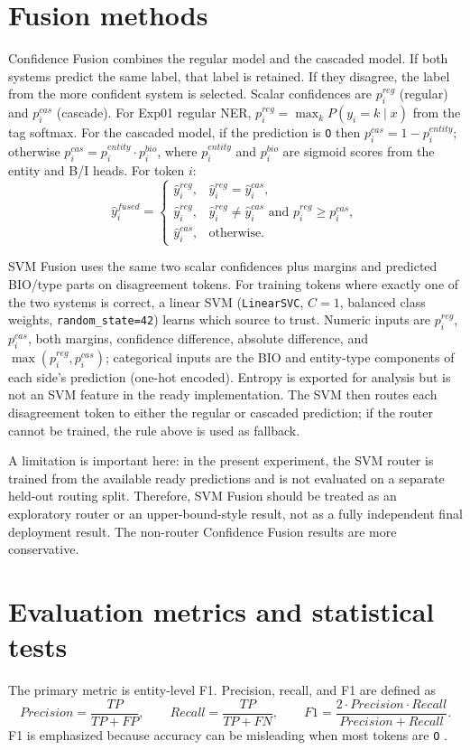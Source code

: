 \documentclass[12pt,a4paper]{report}
\begin{document}
\section{Fusion methods}
Confidence Fusion combines the regular model and the cascaded model. If both systems predict the same label, that label is retained. If they disagree, the label from the more confident system is selected. Scalar confidences are $p_i^{reg}$ (regular) and $p_i^{cas}$ (cascade). For Exp01 regular NER, $p_i^{reg}=\max_k P(y_i=k\mid x)$ from the tag softmax. For the cascaded model, if the prediction is \texttt{O} then $p_i^{cas}=1-p_i^{entity}$; otherwise $p_i^{cas}=p_i^{entity}\cdot p_i^{bio}$, where $p_i^{entity}$ and $p_i^{bio}$ are sigmoid scores from the entity and B/I heads. For token $i$:
\[
\hat{y}_i^{fused}=\begin{cases}
\hat{y}_i^{reg}, & \hat{y}_i^{reg}=\hat{y}_i^{cas},\\
\hat{y}_i^{reg}, & \hat{y}_i^{reg}\neq\hat{y}_i^{cas}\text{ and }p_i^{reg}\geq p_i^{cas},\\
\hat{y}_i^{cas}, & \text{otherwise.}
\end{cases}
\]

SVM Fusion uses the same two scalar confidences plus margins and predicted BIO/type parts on disagreement tokens. For training tokens where exactly one of the two systems is correct, a linear SVM (\texttt{LinearSVC}, $C=1$, balanced class weights, \texttt{random\_state=42}) learns which source to trust. Numeric inputs are $p_i^{reg}$, $p_i^{cas}$, both margins, confidence difference, absolute difference, and $\max(p_i^{reg},p_i^{cas})$; categorical inputs are the BIO and entity-type components of each side's prediction (one-hot encoded). Entropy is exported for analysis but is not an SVM feature in the ready implementation. The SVM then routes each disagreement token to either the regular or cascaded prediction; if the router cannot be trained, the rule above is used as fallback.

A limitation is important here: in the present experiment, the SVM router is trained from the available ready predictions and is not evaluated on a separate held-out routing split. Therefore, SVM Fusion should be treated as an exploratory router or an upper-bound-style result, not as a fully independent final deployment result. The non-router Confidence Fusion results are more conservative.

\section{Evaluation metrics and statistical tests}
The primary metric is entity-level F1. Precision, recall, and F1 are defined as
\[
Precision=\frac{TP}{TP+FP},
\qquad
Recall=\frac{TP}{TP+FN},
\qquad
F1=\frac{2\cdot Precision\cdot Recall}{Precision+Recall}.
\]
F1 is emphasized because accuracy can be misleading when most tokens are \texttt{O} \citep{sokolova2009,chicco2023mcc}.
\end{document}
